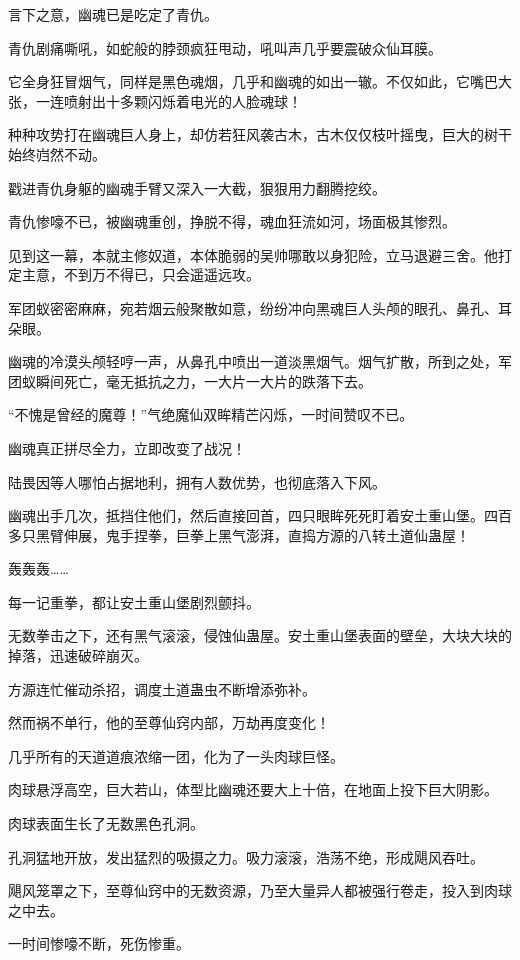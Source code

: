 \begin{this_body}
言下之意，幽魂已是吃定了青仇。

青仇剧痛嘶吼，如蛇般的脖颈疯狂甩动，吼叫声几乎要震破众仙耳膜。

它全身狂冒烟气，同样是黑色魂烟，几乎和幽魂的如出一辙。不仅如此，它嘴巴大张，一连喷射出十多颗闪烁着电光的人脸魂球！

种种攻势打在幽魂巨人身上，却仿若狂风袭古木，古木仅仅枝叶摇曳，巨大的树干始终岿然不动。

戳进青仇身躯的幽魂手臂又深入一大截，狠狠用力翻腾挖绞。

青仇惨嚎不已，被幽魂重创，挣脱不得，魂血狂流如河，场面极其惨烈。

见到这一幕，本就主修奴道，本体脆弱的吴帅哪敢以身犯险，立马退避三舍。他打定主意，不到万不得已，只会遥遥远攻。

军团蚁密密麻麻，宛若烟云般聚散如意，纷纷冲向黑魂巨人头颅的眼孔、鼻孔、耳朵眼。

幽魂的冷漠头颅轻哼一声，从鼻孔中喷出一道淡黑烟气。烟气扩散，所到之处，军团蚁瞬间死亡，毫无抵抗之力，一大片一大片的跌落下去。

“不愧是曾经的魔尊！”气绝魔仙双眸精芒闪烁，一时间赞叹不已。

幽魂真正拼尽全力，立即改变了战况！

陆畏因等人哪怕占据地利，拥有人数优势，也彻底落入下风。

幽魂出手几次，抵挡住他们，然后直接回首，四只眼眸死死盯着安土重山堡。四百多只黑臂伸展，鬼手捏拳，巨拳上黑气澎湃，直捣方源的八转土道仙蛊屋！

轰轰轰……

每一记重拳，都让安土重山堡剧烈颤抖。

无数拳击之下，还有黑气滚滚，侵蚀仙蛊屋。安土重山堡表面的壁垒，大块大块的掉落，迅速破碎崩灭。

方源连忙催动杀招，调度土道蛊虫不断增添弥补。

然而祸不单行，他的至尊仙窍内部，万劫再度变化！

几乎所有的天道道痕浓缩一团，化为了一头肉球巨怪。

肉球悬浮高空，巨大若山，体型比幽魂还要大上十倍，在地面上投下巨大阴影。

肉球表面生长了无数黑色孔洞。

孔洞猛地开放，发出猛烈的吸摄之力。吸力滚滚，浩荡不绝，形成飓风吞吐。

飓风笼罩之下，至尊仙窍中的无数资源，乃至大量异人都被强行卷走，投入到肉球之中去。

一时间惨嚎不断，死伤惨重。


\end{this_body}
